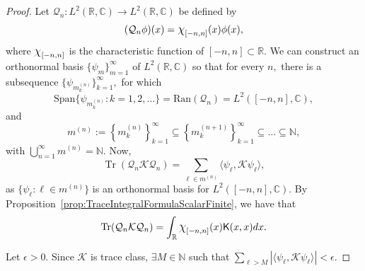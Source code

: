 \documentclass{birkjour}
\theoremstyle{definition}
\theoremstyle{remark}
\numberwithin{equation}{section}
\newcommand*{\bigchi}{\mbox{\large$\chi$}}%
\begin{document}
\begin{proof}
Let $\mathcal{Q}_n: L^2(\mathbb{R},\mathbb{C}) \rightarrow L^2(\mathbb{R},\mathbb{C})$ be defined by 
\begin{equation}
    (\mathcal{Q}_n \phi)(x) = \bigchi_{[-n,n]}(x)\phi(x),
\end{equation}
where $\bigchi_{[-n,n]}$ is the characteristic function of $[-n,n] \subset \mathbb{R}.$ We can construct an orthonormal basis $\{\psi_m\}_{m=1}^{\infty}$ of $L^2(\mathbb{R},\mathbb{C})$
so that for every  $n,$ there is a subsequence $\{\psi_{m_k^{(n)}}\}_{k=1}^{\infty},$ for which
\begin{equation}
    \text{Span}\{ \psi_{m_ k^{(n)}} : k=1,2,\dots\} = \text{Ran}(\mathcal{Q}_n) = L^2([-n,n],\mathbb{C}),
\end{equation}
and
\begin{equation}
    m^{(n)} := \left\{m_k^{(n)}\right\}_{k=1}^{\infty} \subseteq \left\{m_k^{(n+1)}\right\}_{k=1}^{\infty} \subseteq \dots \subseteq \mathbb{N},
\end{equation}
with $\bigcup_{n=1}^{\infty} m^{(n)} = \mathbb{N}$. Now,
\begin{equation}
    \operatorname{Tr}(\mathcal{Q}_n\mathcal{K}\mathcal{Q}_n) = \sum_{\ell \in m^{(n)}} \langle \psi_{\ell}, \mathcal{K} \psi_{\ell} \rangle,
\end{equation}
as $\{\psi_{\ell} : \ell \in m^{(n)}\}$ is an orthonormal basis for 
$L^2([-n,n],\mathbb C)$.  By Proposition~\ref{prop:TraceIntegralFormulaScalarFinite},   we have that
\begin{equation}\label{eq:TrLimit}
\operatorname{Tr}(\mathcal{Q}_n \mathcal{K} \mathcal{Q}_n)
= \int_{\mathbb{R}} \bigchi_{[-n,n]}(x) {\textsf K}(x,x) dx. 
\end{equation}

Let $\epsilon > 0$. Since $\mathcal{K}$ is trace class, $\exists M \in \mathbb{N}$ such that 
  $  \sum_{\ell > M} |\langle \psi_{\ell}, \mathcal{K}\psi_{\ell} \rangle| < \epsilon$.

\end{proof}
\end{document}

